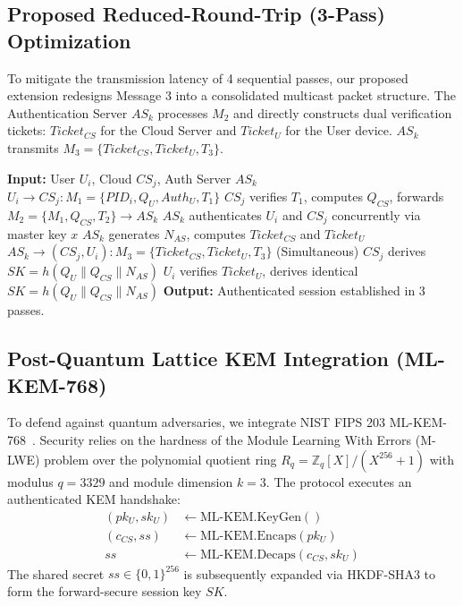 \documentclass[journal,10pt,twocolumn]{IEEEtran}
\begin{document}
\subsection{Proposed Reduced-Round-Trip (3-Pass) Optimization}
To mitigate the transmission latency of 4 sequential passes, our proposed extension redesigns Message 3 into a consolidated multicast packet structure. The Authentication Server $AS_k$ processes $M_2$ and directly constructs dual verification tickets: $Ticket_{CS}$ for the Cloud Server and $Ticket_U$ for the User device. $AS_k$ transmits $M_3 = \{ Ticket_{CS}, Ticket_U, T_3 \}$.

\begin{algorithmic}[1]
\STATE \textbf{Input:} User $U_i$, Cloud $CS_j$, Auth Server $AS_k$
\STATE $U_i \rightarrow CS_j: M_1 = \{ PID_i, Q_U, Auth_U, T_1 \}$
\STATE $CS_j$ verifies $T_1$, computes $Q_{CS}$, forwards $M_2 = \{ M_1, Q_{CS}, T_2 \} \rightarrow AS_k$
\STATE $AS_k$ authenticates $U_i$ and $CS_j$ concurrently via master key $x$
\STATE $AS_k$ generates $N_{AS}$, computes $Ticket_{CS}$ and $Ticket_U$
\STATE $AS_k \rightarrow (CS_j, U_i): M_3 = \{ Ticket_{CS}, Ticket_U, T_3 \}$ (Simultaneous)
\STATE $CS_j$ derives $SK = h(Q_U \parallel Q_{CS} \parallel N_{AS})$
\STATE $U_i$ verifies $Ticket_U$, derives identical $SK = h(Q_U \parallel Q_{CS} \parallel N_{AS})$
\STATE \textbf{Output:} Authenticated session established in 3 passes.
\end{algorithmic}

\subsection{Post-Quantum Lattice KEM Integration (ML-KEM-768)}
To defend against quantum adversaries, we integrate NIST FIPS 203 ML-KEM-768~\cite{fips203}. Security relies on the hardness of the Module Learning With Errors (M-LWE) problem over the polynomial quotient ring $R_q = \mathbb{Z}_q[X] / (X^{256} + 1)$ with modulus $q = 3329$ and module dimension $k = 3$. The protocol executes an authenticated KEM handshake:
\begin{align}
    (pk_U, sk_U) &\leftarrow \text{ML-KEM.KeyGen}() \\
    (c_{CS}, ss) &\leftarrow \text{ML-KEM.Encaps}(pk_U) \\
    ss &\leftarrow \text{ML-KEM.Decaps}(c_{CS}, sk_U)
\end{align}
The shared secret $ss \in \{0,1\}^{256}$ is subsequently expanded via HKDF-SHA3 to form the forward-secure session key $SK$.
\end{document}
